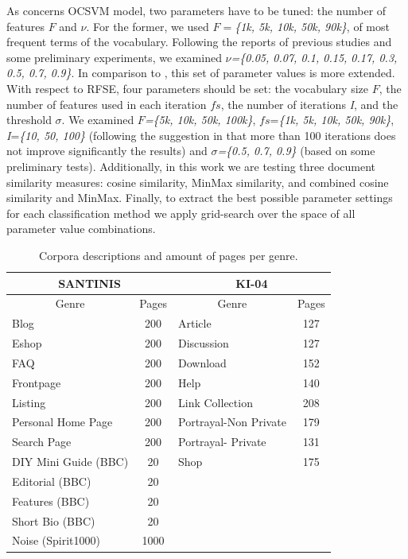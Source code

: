 As concerns OCSVM model, two parameters have to be tuned: the number of features $F$ and $\nu$. For the former, we used $F=$\textit{\{1k, 5k, 10k, 50k, 90k\}}, of most frequent terms of the vocabulary. Following the reports of previous studies \citep{scholkopf1999estimating} and some preliminary experiments, we examined $\nu$\textit{=\{0.05, 0.07, 0.1, 0.15, 0.17, 0.3, 0.5, 0.7, 0.9\}}. In comparison to \citep{pritsos2013open}, this set of parameter values is more extended. With respect to RFSE, four parameters should be set: the vocabulary size $F$, the number of features used in each iteration $fs$, the number of iterations \textit{I}, and the threshold $\sigma$. We examined $F$\textit{=\{5k, 10k, 50k, 100k\}}, $fs$=\textit{\{1k, 5k, 10k, 50k, 90k\}}, \textit{I}=\textit{\{10, 50, 100\}} (following the suggestion in \citep{koppel2011authorship} that more than 100 iterations does not improve significantly the results) and $\sigma$\textit{=\{0.5, 0.7, 0.9\}} (based on some preliminary tests). Additionally, in this work we are testing three document similarity measures: cosine similarity, MinMax similarity,  and combined cosine similarity and MinMax. Finally, to extract the best possible parameter settings for each classification method we apply grid-search over the space of all parameter value combinations.

\begin{table}
\center
\begin{tabular}{|l|l|l|l|}
\hline
\multicolumn{2}{|c|}{SANTINIS} & \multicolumn{2}{c|}{KI-04}\tabularnewline
\hline
\multicolumn{1}{|c|}{Genre} & \multicolumn{1}{c|}{Pages} & \multicolumn{1}{c|}{Genre} & \multicolumn{1}{c|}{Pages}\tabularnewline
\hline
\multicolumn{1}{|l|}{Blog} & \multicolumn{1}{c|}{200} & \multicolumn{1}{l|}{Article} & \multicolumn{1}{c|}{127}\tabularnewline
\multicolumn{1}{|l|}{Eshop} & \multicolumn{1}{c|}{200} & \multicolumn{1}{l|}{Discussion} & \multicolumn{1}{c|}{127}\tabularnewline
\multicolumn{1}{|l|}{FAQ} & \multicolumn{1}{c|}{200} & \multicolumn{1}{l|}{Download} & \multicolumn{1}{c|}{152}\tabularnewline
\multicolumn{1}{|l|}{Frontpage} & \multicolumn{1}{c|}{200} & \multicolumn{1}{l|}{Help} & \multicolumn{1}{c|}{140}\tabularnewline
\multicolumn{1}{|l|}{Listing} & \multicolumn{1}{c|}{200} & \multicolumn{1}{l|}{Link Collection} & \multicolumn{1}{c|}{208}\tabularnewline
\multicolumn{1}{|l|}{Personal Home Page} & \multicolumn{1}{c|}{200} & \multicolumn{1}{l|}{Portrayal-Non Private} & \multicolumn{1}{c|}{179}\tabularnewline
\multicolumn{1}{|l|}{Search Page} & \multicolumn{1}{c|}{200} & \multicolumn{1}{l|}{Portrayal- Private} & \multicolumn{1}{c|}{131}\tabularnewline
\multicolumn{1}{|l|}{DIY Mini Guide (BBC)} & \multicolumn{1}{c|}{20} & \multicolumn{1}{l|}{Shop} & \multicolumn{1}{c|}{175}\tabularnewline
\multicolumn{1}{|l|}{Editorial (BBC)} & \multicolumn{1}{c|}{20} &  & \tabularnewline
\multicolumn{1}{|l|}{Features (BBC)} & \multicolumn{1}{c|}{20} &  & \tabularnewline
\multicolumn{1}{|l|}{Short Bio (BBC)} & \multicolumn{1}{c|}{20} &  & \tabularnewline
\multicolumn{1}{|l|}{Noise (Spirit1000)} & \multicolumn{1}{c|}{1000} &  & \tabularnewline
\hline
\end{tabular}
\caption {Corpora descriptions and amount of pages per genre.}
\label{tbl:genre_tags}
\end{table}



